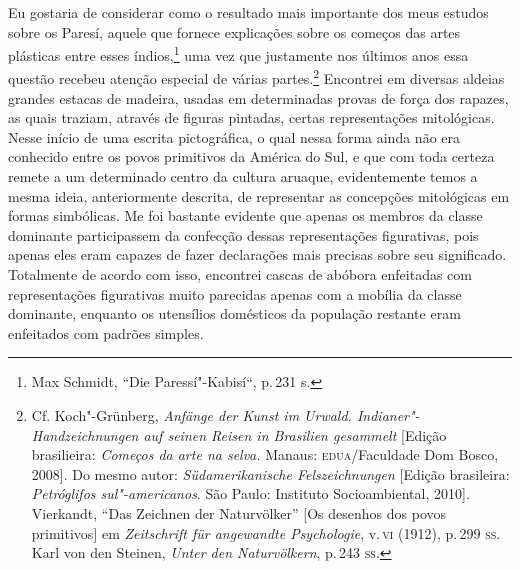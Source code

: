Eu gostaria de considerar como o resultado mais importante dos meus
estudos sobre os Paresí, aquele que fornece explicações sobre os
começos das artes plásticas entre esses índios,\footnote{Max Schmidt,
  ``Die Paressí"-Kabisí``, p.\,231 s.} uma vez que justamente nos últimos
anos essa questão recebeu atenção especial de várias partes.\footnote{Cf.
  Koch"-Grünberg, \textit{Anfänge der Kunst im Urwald.
  Indianer"-Handzeichnungen auf seinen Reisen in Brasilien gesammelt}
  {[}Edição brasilieira: \textit{Começos da arte na selva.} Manaus:
  \textsc{edua}/Faculdade Dom Bosco, 2008{]}. Do mesmo autor:
  \textit{Südamerikanische Felszeichnungen} {[}Edição brasileira:
  \textit{Petróglifos sul"-americanos}. São Paulo: Instituto
  Socioambiental, 2010{]}. Vierkandt, ``Das Zeichnen der Naturvölker''
  {[}Os desenhos dos povos primitivos{]} em \textit{Zeitschrift für
  angewandte Psychologie}, v.\,\textsc{vi} (1912), p.\,299 \textsc{ss}. Karl von den
  Steinen, \textit{Unter den Naturvölkern}, p.\,243 \textsc{ss}.} Encontrei em
diversas aldeias grandes estacas de madeira, usadas em determinadas
provas de força dos rapazes, as quais traziam, através de figuras
pintadas, certas representações mitológicas. Nesse início de uma escrita
pictográfica, o qual nessa forma ainda não era conhecido entre os povos
primitivos da América do Sul, e que com toda certeza remete a um
determinado centro da cultura aruaque, evidentemente temos a mesma
ideia, anteriormente descrita, de representar as concepções mitológicas
em formas simbólicas. Me foi bastante evidente que apenas os membros da
classe dominante participassem da confecção dessas representações
figurativas, pois apenas eles eram capazes de fazer declarações mais
precisas sobre seu significado. Totalmente de acordo com isso, encontrei
cascas de abóbora enfeitadas com representações figurativas muito
parecidas apenas com a mobília da classe dominante, enquanto os
utensílios domésticos da população restante eram enfeitados com padrões
simples.

